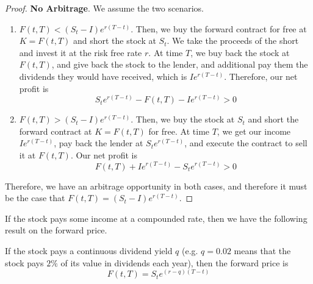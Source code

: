 \documentclass{article}
\begin{document}
    \begin{proof}
      \textbf{No Arbitrage}. We assume the two scenarios. 
      \begin{enumerate}
        \item $F(t, T) < (S_t - I) e^{r(T - t)}$. Then, we buy the forward contract for free at $K = F(t, T)$ and short the stock at $S_t$. We take the proceeds of the short and invest it at the risk free rate $r$. At time $T$, we buy back the stock at $F(t, T)$, and give back the stock to the lender, and additional pay them the dividends they would have received, which is $I e^{r(T - t)}$. Therefore, our net profit is
          \begin{equation}
            S_t e^{r(T - t)} - F(t, T) - I e^{r(T - t)} > 0
          \end{equation}
        \item $F(t, T) > (S_t - I) e^{r(T - t)}$. Then, we buy the stock at $S_t$ and short the forward contract at $K = F(t, T)$ for free. At time $T$, we get our income $I e^{r(T - t)}$, pay back the lender at $S_t e^{r(T - t)}$, and execute the contract to sell it at $F(t, T)$. Our net profit is 
          \begin{equation}
            F(t, T) + I e^{r(T - t)} - S_t e^{r(T - t)} > 0
          \end{equation}
      \end{enumerate}
      Therefore, we have an arbitrage opportunity in both cases, and therefore it must be the case that $F(t, T) = (S_t - I) e^{r(T - t)}$.
    \end{proof}

    If the stock pays some income at a compounded rate, then we have the following result on the forward price. 

    \begin{theorem}
      If the stock pays a continuous dividend yield $q$ (e.g. $q = 0.02$ means that the stock pays $2\%$ of its value in dividends each year), then the forward price is 
      \begin{equation}
        F(t, T) = S_t e^{(r - q)(T - t)}
      \end{equation}
    \end{theorem}
\end{document}
